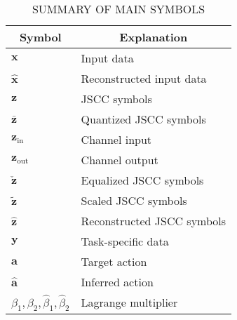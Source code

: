 

\begin{table}
\centering
\footnotesize
\caption{SUMMARY OF MAIN SYMBOLS}
\label{tab_notation}
\begin{tabular}{ll} 
\toprule
\multicolumn{1}{c}{\textbf{Symbol}}                                                         & \multicolumn{1}{c}{\textbf{Explanation}}   \\ 
\midrule
$\bm{x}$                                                                                    & Input data                                 \\
$\hat{\bm{x}}$                                                                              & Reconstructed input data                   \\
$\bm{z}$                                                                                    & JSCC symbols                               \\
$\bar{\bm{z}}$                                                                              & Quantized JSCC symbols                     \\
$\bm{z}_{\text{in}}$                                                                        & Channel input     \\
$\bm{z}_{\text{out}}$                                                                       & Channel output                             \\
$\check{\bm{z}}$                                                                            & Equalized JSCC symbols                     \\
$\tilde{\bm{z}}$                                                                            & Scaled JSCC symbols                        \\
$\hat{\bm{z}}$                                                                              & Reconstructed JSCC symbols                 \\
$\bm{y}$                                                                                    & Task-specific data                         \\
$\bm{a}$                                                                                    & Target action            \\
$\hat{\bm{a}}$                                                                              & Inferred action                           \\
$\beta_1, \beta_2, \hat{\beta}_1, \hat{\beta}_2$                                            & Lagrange multiplier                        \\

\end{tabular}
\end{table}
